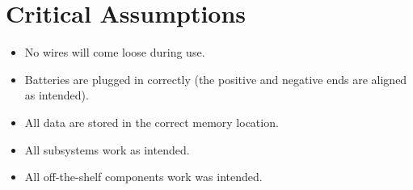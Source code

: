 \documentclass{article}
\begin{document}
\section{Critical Assumptions }

\begin{itemize}
	\item No wires will come loose during use.
	\item Batteries are plugged in correctly (the positive and negative ends are aligned as intended).
	\item All data are stored in the correct memory location.
	\item All subsystems work as intended.
	\item All off-the-shelf components work was intended.
\end{itemize}
\end{document}
